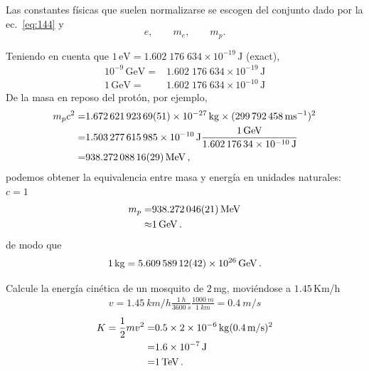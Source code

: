 Las constantes físicas que suelen normalizarse se escogen del conjunto dado por la ec.~\eqref{eq:144} y
\begin{equation}
  \label{eq:145}
  e,\qquad m_e,\qquad m_p.
\end{equation}
\begin{frame}
Teniendo en cuenta que $1\,\text{eV}=1.602\;176\;634\times10^{-19}\,\text{J}$ (exact), 
\begin{align}
  10^{-9}\,\text{GeV}=&1.602\;176\;634\times10^{-19}\,\text{J}\nonumber\\
  1\,\text{GeV}=&1.602\;176\;634\times10^{-10}\,\text{J}
\end{align}
De la masa en reposo del protón, por ejemplo, 
\begin{align*}
  m_pc^2=&\SI{1.67262192369 +- 0.00000000051E-27}{kg}\times (\SI{299792458}{ms^{-1}})^2\nonumber\\
  =&\SI{1.503277615985e-10}{J}\frac{\SI{1}{GeV}}{\SI{1.60217634E-10}{J}}\nonumber\\
  =&\SI{938.27208816+-0.00000029}{\MeV}\,,
\end{align*}
podemos obtener la equivalencia entre masa y energía en unidades naturales: $c=1$
\begin{align}
m_p=&\SI{938.272046+-0.000021}{MeV}\nonumber\\
  \approx& \SI{1}{GeV}\,.
\end{align}
de modo que
\begin{align}
  \SI{1}{kg}=\SI{5.60958912 +- 0.00000042E26}{GeV}\,.
\end{align}

\begin{example}
  Calcule la energía cinética de un mosquito de $2\,$mg, moviéndose a $1.45\,$Km/h
  \begin{align}
    v= \SI{1.45}{km/h}\frac{\SI{1}{h}}{\SI{3600}{s}}\frac{\SI{1000}{m}}{\SI{1}{km}}=\SI{0.4}{m/s}  
\end{align}
\begin{align}
  K=\frac{1}{2}mv^2=&0.5\times \SI{2E-6}{kg}(\SI{0.4}{m/s})^2 \nonumber\\
                   =&\SI{1.6E-7}{J}\nonumber\\
                   =&\SI{1}{TeV}\,.
\end{align}

\end{example}


\end{frame}
